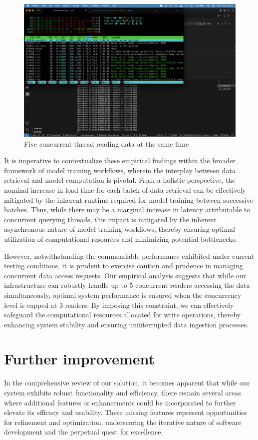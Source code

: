 \begin{figure}[ht]
    \centering
    \includegraphics[width=0.8\linewidth]{Images/5-read-5-process-at-once.png}
    \vspace{1cm}
    \caption{Five concurrent thread reading data at the same time}
    \label{fig:concurrent-read}
\end{figure}

It is imperative to contextualize these empirical findings within the broader
framework of model training workflows, wherein the interplay between data
retrieval and model computation is pivotal. From a holistic perspective, the
nominal increase in load time for each batch of data retrieval can be
effectively mitigated by the inherent runtime required for model training
between successive batches. Thus, while there may be a marginal increase in
latency attributable to concurrent querying threads, this impact is mitigated by
the inherent asynchronous nature of model training workflows, thereby ensuring
optimal utilization of computational resources and minimizing potential
bottlenecks.

However, notwithstanding the commendable performance exhibited under current
testing conditions, it is prudent to exercise caution and prudence in managing
concurrent data access requests. Our empirical analysis suggests that while our
infrastructure can robustly handle up to 5 concurrent readers accessing the data
simultaneously, optimal system performance is ensured when the concurrency level
is capped at 3 readers. By imposing this constraint, we can effectively
safeguard the computational resources allocated for write operations, thereby
enhancing system stability and ensuring uninterrupted data ingestion processes.


\section{Further improvement}
In the comprehensive review of our solution, it becomes apparent that while our
system exhibits robust functionality and efficiency, there remain several areas
where additional features or enhancements could be incorporated to further
elevate its efficacy and usability. These missing features represent
opportunities for refinement and optimization, underscoring the iterative nature
of software development and the perpetual quest for excellence.

